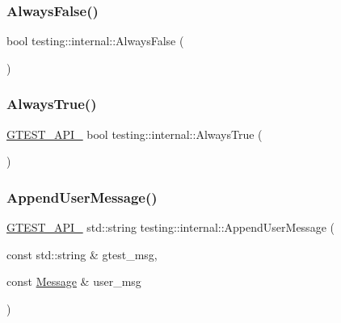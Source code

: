 \subsubsection{\texorpdfstring{AlwaysFalse()}{AlwaysFalse()}}
{\footnotesize\ttfamily bool testing\+::internal\+::\+Always\+False (\begin{DoxyParamCaption}{ }\end{DoxyParamCaption})\hspace{0.3cm}{\ttfamily [inline]}}

\mbox{\label{namespacetesting_1_1internal_a4d46f09c3bfe68700b7f728d2cc3782f}} 
\subsubsection{\texorpdfstring{AlwaysTrue()}{AlwaysTrue()}}
{\footnotesize\ttfamily \mbox{\hyperlink{gtest-port_8h_aa73be6f0ba4a7456180a94904ce17790}{G\+T\+E\+S\+T\+\_\+\+A\+P\+I\+\_\+}} bool testing\+::internal\+::\+Always\+True (\begin{DoxyParamCaption}{ }\end{DoxyParamCaption})}

\mbox{\label{namespacetesting_1_1internal_af69e146a989e8d48def39a0cc59461c9}} 
\subsubsection{\texorpdfstring{AppendUserMessage()}{AppendUserMessage()}}
{\footnotesize\ttfamily \mbox{\hyperlink{gtest-port_8h_aa73be6f0ba4a7456180a94904ce17790}{G\+T\+E\+S\+T\+\_\+\+A\+P\+I\+\_\+}} std\+::string testing\+::internal\+::\+Append\+User\+Message (\begin{DoxyParamCaption}\item[{const std\+::string \&}]{gtest\+\_\+msg,  }\item[{const \mbox{\hyperlink{classtesting_1_1_message}{Message}} \&}]{user\+\_\+msg }\end{DoxyParamCaption})}

\mbox{\label{namespacetesting_1_1internal_a94a857fe6ff32cf4fdc4769a4071f239}} 
